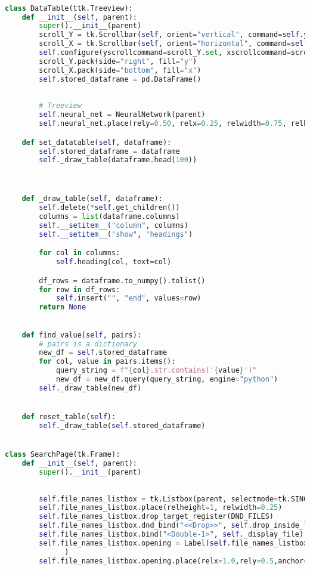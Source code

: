 \documentclass[12pt,letterpaper,oneside,reqno]{book}
\theoremstyle{plain}
\theoremstyle{definition}
\theoremstyle{plain}
\theoremstyle{remark}
\theoremstyle{plain}
\theoremstyle{definition}
\theoremstyle{plain}
\begin{document}
\begin{appendices}
\begin{lstlisting}[language=Python, label=lst:guifull, frame=single]
        


    

class DataTable(ttk.Treeview):
    def __init__(self, parent):
        super().__init__(parent)
        scroll_Y = tk.Scrollbar(self, orient="vertical", command=self.yview)
        scroll_X = tk.Scrollbar(self, orient="horizontal", command=self.xview)
        self.configure(yscrollcommand=scroll_Y.set, xscrollcommand=scroll_X.set)
        scroll_Y.pack(side="right", fill="y")
        scroll_X.pack(side="bottom", fill="x")
        self.stored_dataframe = pd.DataFrame()
        
        
        # Treeview
        self.neural_net = NeuralNetwork(parent)
        self.neural_net.place(rely=0.50, relx=0.25, relwidth=0.75, relheight=0.50)

    def set_datatable(self, dataframe):
        self.stored_dataframe = dataframe
        self._draw_table(dataframe.head(100))



    def _draw_table(self, dataframe):
        self.delete(*self.get_children())
        columns = list(dataframe.columns)
        self.__setitem__("column", columns)
        self.__setitem__("show", "headings")

        for col in columns:
            self.heading(col, text=col)

        df_rows = dataframe.to_numpy().tolist()
        for row in df_rows:
            self.insert("", "end", values=row)
        return None
    

    def find_value(self, pairs):
        # pairs is a dictionary
        new_df = self.stored_dataframe
        for col, value in pairs.items():
            query_string = f"{col}.str.contains('{value}')"
            new_df = new_df.query(query_string, engine="python")
        self._draw_table(new_df)


    def reset_table(self):
        self._draw_table(self.stored_dataframe)


class SearchPage(tk.Frame):
    def __init__(self, parent):
        super().__init__(parent)
        
        
        self.file_names_listbox = tk.Listbox(parent, selectmode=tk.SINGLE, bg="#D7A7AA", fg="white")
        self.file_names_listbox.place(relheight=1, relwidth=0.25)
        self.file_names_listbox.drop_target_register(DND_FILES)
        self.file_names_listbox.dnd_bind("<<Drop>>", self.drop_inside_list_box)
        self.file_names_listbox.bind("<Double-1>", self._display_file)
        self.file_names_listbox.opening = Label(self.file_names_listbox, text="Please drop your CSV files over here", background="#D7A7AA", fg="white", font=("Arial", 10)
              )
        self.file_names_listbox.opening.place(relx=1.0,rely=0.5,anchor=E)
        


\end{lstlisting}
\end{appendices}
\end{document}
